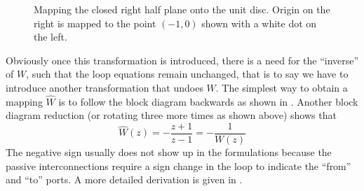 \begin{figure}%
\centering
{}
\caption[Mapping the closed right half plane onto the unit disc.]%
{Mapping the closed right half plane onto the unit disc. Origin on the right is mapped to the point $(-1,0)$ shown with a white dot on the left.}%
\label{fig:lit:smith}%
\end{figure}

Obviously once this transformation is introduced, there is a need for the ``inverse'' of $W$, such that the
loop equations remain unchanged, that is to say we have to introduce another transformation that undoes
$W$. The simplest way to obtain a mapping $\hat{W}$ is to follow the block diagram backwards as shown in 
. Another block diagram reduction (or rotating three more times as shown above) shows that 
\[
\hat{W}(z) = -\frac{z+1}{z-1} = -\frac{1}{W(z)}
\]
The negative sign usually does not show up in the formulations because the passive interconnections 
require a sign change in the loop to indicate the ``from'' and ``to'' ports. A more detailed derivation
is given in \cite{colgate3}.


